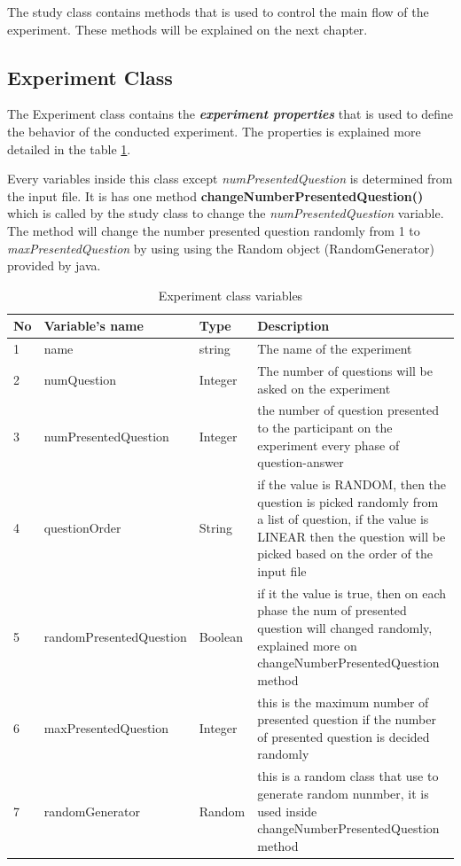 
The study class contains methods that is used to control the main flow of the experiment.
These methods will be explained on the next chapter.
\subsection{Experiment Class}
The Experiment class contains the \textit{\textbf{experiment properties}} that is used to define the behavior of the conducted experiment. The properties is explained more detailed in the table \ref{tab:ExperimentClassVariable}.

Every variables inside this class except \textit{numPresentedQuestion} is determined from the input file. It is has one method \textbf{changeNumberPresentedQuestion()} which is called by the study class to change the \textit{numPresentedQuestion} variable. The method will change the number presented question randomly from 1 to \textit{maxPresentedQuestion} by using using the Random object (RandomGenerator) provided by java.



\begin{table}[!htb]
  \centering
\begin{longtable}{ |p{0.5cm}|p{4cm}|p{2.3cm}|p{6cm}|  }
 \hline
 No& Variable's name & Type & Description \\
 \hline
 1 & name & string  & The name of the experiment\\
 2 & numQuestion & Integer & The number of questions will be asked on the experiment \\
 3 & numPresentedQuestion & Integer & the number of question presented to the participant on the experiment every phase of question-answer \\
 4 & questionOrder & String & if the value is RANDOM, then the question is picked randomly from a list of question, if the value is LINEAR then the question will be picked based on the order of the input file \\
 5 & randomPresentedQuestion & Boolean & if it the value is true, then on each phase the num of presented question will changed randomly, explained more on changeNumberPresentedQuestion method \\
 6 & maxPresentedQuestion & Integer & this is the maximum number of presented question if the number of presented question is decided randomly\\
 7 & randomGenerator & Random  & this is a random class that use to generate random nunmber, it is used inside changeNumberPresentedQuestion method \\
\hline
\end{longtable} \par
\caption{Experiment class variables}
 \label{tab:ExperimentClassVariable}
\end{table}


